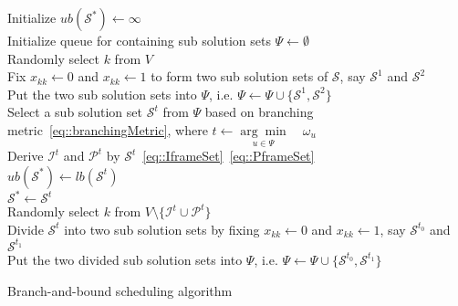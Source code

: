 \begin{algorithm}[]
 \SetAlgoLined
 \BlankLine
 Initialize $ub(\mathcal{S}^*) \gets \infty$ \\
 Initialize queue for containing sub solution sets $\Psi \gets \emptyset$ \\
 Randomly select $k$ from $V$ \\
 Fix $x_{kk} \gets 0$ and $x_{kk} \gets 1$ to form two sub solution sets of $\mathcal{S}$, say $\mathcal{S}^1$ and $\mathcal{S}^2$ \\
 Put the two sub solution sets into $\Psi$, i.e. $\Psi \gets \Psi \cup \{\mathcal{S}^1, \mathcal{S}^2\}$ \\
 \While{$\Psi \neq \emptyset$}
 {
 	Select a sub solution set $\mathcal{S}^t$ from $\Psi$ based on branching metric~\eqref{eq::branchingMetric}, where $t \gets \underset{u \in \Psi}{\arg \min} \quad \omega_u$ \\
 	Derive $\mathcal{I}^t$ and $\mathcal{P}^t$ by $\mathcal{S}^t$~\eqref{eq::IframeSet}~\eqref{eq::PframeSet} \\
  	{
  		{
  			$ub(\mathcal{S}^*) \gets lb(\mathcal{S}^t)$ \\
  			$\mathcal{S}^* \gets \mathcal{S}^t$ \\
  		}
 	}
 	{	
 		{
 			Randomly select $k$ from $V \setminus \{\mathcal{I}^t \cup \mathcal{P}^t\}$ \\
 			Divide $\mathcal{S}^t$ into two sub solution sets by fixing $x_{kk} \gets 0$ and $x_{kk} \gets 1$, say $\mathcal{S}^{t_0}$ and $\mathcal{S}^{t_1}$ \\
 			Put the two divided sub solution sets into $\Psi$, i.e. $\Psi \gets \Psi \cup \{\mathcal{S}^{t_0}, \mathcal{S}^{t_1}\}$\\
 		}
 	}
 }
 \caption{\label{alg::bbAlgorithm}Branch-and-bound scheduling algorithm}
\end{algorithm}
\DecMargin{1em}
%
%
